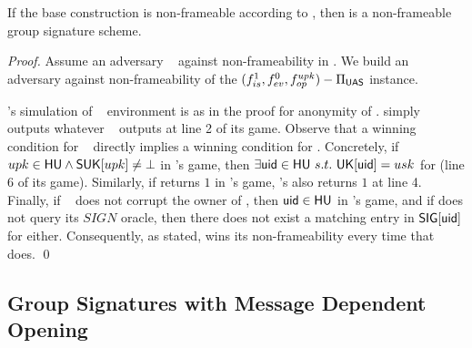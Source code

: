 \begin{theorem}
  If the base \CUASGen construction is non-frameable according to
  , then \CUASGS is a non-frameable group signature
  scheme.
\end{theorem}

\begin{proof}
  Assume an adversary \adv~ against non-frameability in \CUASGS. We build an
  adversary \advB against non-frameability of the $(f_{is}^1,f_{ev}^0,
  f_{op}^{upk})-\Pi_{\mathsf{UAS}}$ instance.

  \advB's simulation of \adv~ environment is as in the proof for anonymity
  of \CUASGS. \advB simply outputs whatever \adv~ outputs at line 2 of its
  game. Observe that a winning condition for \adv~ directly implies a winning
  condition for \advB. Concretely, if $upk \in \mathsf{HU} \land \mathsf{S}\mathsf{UK}[upk] \neq
  \bot$ in \adv's game, then $\exists \mathsf{uid} \in \mathsf{HU}~s.t.~\mathsf{UK}[\mathsf{uid}]=usk$
  for \advB (line 6 of its game). Similarly, if \Judge returns $1$ in \adv's
  game, \advB's \Judge also returns $1$ at line 4. Finally, if \adv~ does not
  corrupt the owner of \upk, then $\mathsf{uid} \in \mathsf{HU}$ in \advB's game, and if \adv
  does not query its $SIGN$ oracle, then there does not exist a matching entry
  in $\mathsf{SIG}[\mathsf{uid}]$ for \advB either. Consequently, as stated, \advB wins its
  non-frameability every time that \adv does.
  \qed
\end{proof}

\subsection{Group Signatures with Message Dependent Opening}
\label{sapp:related-models-gsmdo}

